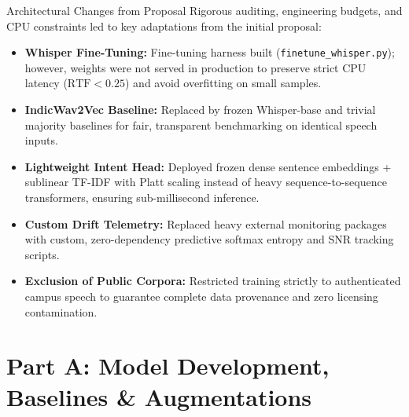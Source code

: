 \documentclass[10pt]{beamer}
\begin{document}
\begin{frame}{Architectural Changes from Proposal}
    \small
    Rigorous auditing, engineering budgets, and CPU constraints led to key adaptations from the initial proposal:\\[6pt]

    \begin{itemize}\setlength{\itemsep}{4pt}
        \item \textbf{Whisper Fine-Tuning:} Fine-tuning harness built (\texttt{finetune\_whisper.py}); however, weights were not served in production to preserve strict CPU latency ($\text{RTF} < 0.25$) and avoid overfitting on small samples.
        \item \textbf{IndicWav2Vec Baseline:} Replaced by frozen Whisper-base and trivial majority baselines for fair, transparent benchmarking on identical speech inputs.
        \item \textbf{Lightweight Intent Head:} Deployed frozen dense sentence embeddings + sublinear TF-IDF with Platt scaling instead of heavy sequence-to-sequence transformers, ensuring sub-millisecond inference.
        \item \textbf{Custom Drift Telemetry:} Replaced heavy external monitoring packages with custom, zero-dependency predictive softmax entropy and SNR tracking scripts.
        \item \textbf{Exclusion of Public Corpora:} Restricted training strictly to authenticated campus speech to guarantee complete data provenance and zero licensing contamination.
    \end{itemize}
\end{frame}

\section{Part A: Model Development, Baselines \& Augmentations}
\end{document}
